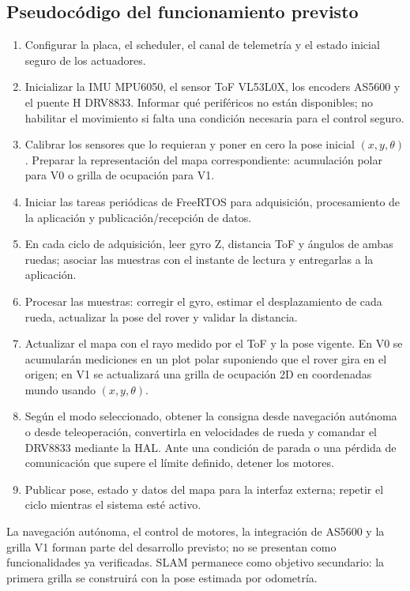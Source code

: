 \subsection{Pseudocódigo del funcionamiento previsto}

\begin{enumerate}
  \item Configurar la placa, el scheduler, el canal de telemetría y el estado
        inicial seguro de los actuadores.
  \item Inicializar la IMU MPU6050, el sensor ToF VL53L0X, los encoders AS5600
        y el puente H DRV8833. Informar qué periféricos no están disponibles;
        no habilitar el movimiento si falta una condición necesaria para el
        control seguro.
  \item Calibrar los sensores que lo requieran y poner en cero la pose inicial
        $(x,y,\theta)$. Preparar la representación del mapa correspondiente:
        acumulación polar para V0 o grilla de ocupación para V1.
  \item Iniciar las tareas periódicas de FreeRTOS para adquisición,
        procesamiento de la aplicación y publicación/recepción de datos.
  \item En cada ciclo de adquisición, leer gyro Z, distancia ToF y ángulos de
        ambas ruedas; asociar las muestras con el instante de lectura y
        entregarlas a la aplicación.
  \item Procesar las muestras: corregir el gyro, estimar el desplazamiento de
        cada rueda, actualizar la pose del rover y validar la distancia.
  \item Actualizar el mapa con el rayo medido por el ToF y la pose vigente.
        En V0 se acumularán mediciones en un plot polar suponiendo que el rover
        gira en el origen; en V1 se actualizará una grilla de ocupación 2D en
        coordenadas mundo usando $(x,y,\theta)$.
  \item Según el modo seleccionado, obtener la consigna desde navegación
        autónoma o desde teleoperación, convertirla en velocidades de rueda y
        comandar el DRV8833 mediante la HAL. Ante una condición de parada o una
        pérdida de comunicación que supere el límite definido, detener los
        motores.
  \item Publicar pose, estado y datos del mapa para la interfaz externa;
        repetir el ciclo mientras el sistema esté activo.
\end{enumerate}

La navegación autónoma, el control de motores, la integración de AS5600 y la
grilla V1 forman parte del desarrollo previsto; no se presentan como
funcionalidades ya verificadas. SLAM permanece como objetivo secundario: la
primera grilla se construirá con la pose estimada por odometría.

